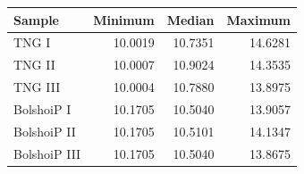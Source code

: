 \begin{tabular}{lrrr}
\toprule
Sample & Minimum & Median & Maximum \\
\midrule
TNG I & 10.0019 & 10.7351 & 14.6281 \\
TNG II & 10.0007 & 10.9024 & 14.3535 \\
TNG III & 10.0004 & 10.7880 & 13.8975 \\
BolshoiP I & 10.1705 & 10.5040 & 13.9057 \\
BolshoiP II & 10.1705 & 10.5101 & 14.1347 \\
BolshoiP III & 10.1705 & 10.5040 & 13.8675 \\
\bottomrule
\end{tabular}
